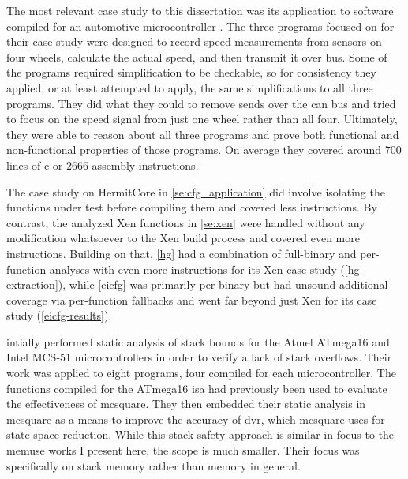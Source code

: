 The most relevant case study to this dissertation was its application
to software compiled for an automotive microcontroller \autocite{schlich2007automotive}.
The three programs \citeauthor{schlich2007automotive} focused on for their case study were designed to record speed measurements from sensors on four wheels,
calculate the actual speed, and then transmit it over  bus.
Some of the programs required simplification to be checkable,
so for consistency they applied, or at least attempted to apply,
the same simplifications to all three programs.
They did what they could to remove sends over the \gls{can} bus
and tried to focus on the speed signal from just one wheel rather than all four.
Ultimately, they were able to reason about all three programs
and prove both functional and non-functional properties of those programs.
On average they covered around \num{700} lines of \gls{c} or \num{2666} assembly instructions.
\begin{remark}
  The case study on HermitCore in \cref{se:cfg_application} did involve isolating the functions under test before compiling them and covered less instructions.
  By contrast, the analyzed Xen functions in \cref{se:xen} were handled without any modification whatsoever to the Xen build process and covered even more instructions.
  Building on that, \cref{hg} had a combination of full-binary and per-function analyses with even more instructions for its Xen case study (\cref{hg-extraction}), while \cref{eicfg} was primarily per-binary but had unsound additional coverage via per-function fallbacks and went far beyond just Xen for its case study (\cref{eicfg-results}).
\end{remark}

\Textcite{brauer2009sba} intially performed static analysis of stack bounds
for the Atmel ATmega16 and Intel MCS-51 microcontrollers
in order to verify a lack of stack overflows.
Their work was applied to eight programs, four compiled for each microcontroller.
The functions compiled for the ATmega16 \ac{isa}
had previously been used to evaluate the effectiveness of \gls{mcsquare}.
They then embedded their static analysis in \gls{mcsquare} as a means to
improve the accuracy of \ac{dvr}, which \gls{mcsquare} uses for state space reduction.
While this stack safety approach is similar in focus to the \gls{memuse} works
I present here, the scope is much smaller.
Their focus was specifically on stack memory rather than memory in general.


